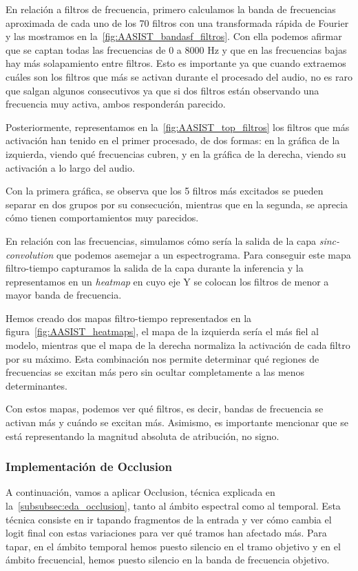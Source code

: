 En relación a filtros de frecuencia, primero calculamos la banda de frecuencias aproximada de cada uno de los 70 filtros con una transformada rápida de Fourier y las mostramos en la~\autoref{fig:AASIST_bandasf_filtros}. Con ella podemos afirmar que se captan todas las frecuencias de 0 a 8000 Hz y que en las frecuencias bajas hay más solapamiento entre filtros. Esto es importante ya que cuando extraemos cuáles son los filtros que más se activan durante el procesado del audio, no es raro que salgan algunos consecutivos ya que si dos filtros están observando una frecuencia muy activa, ambos responderán parecido.

Posteriormente, representamos en la~\autoref{fig:AASIST_top_filtros} los filtros que más activación han tenido en el primer procesado, de dos formas: en la gráfica de la izquierda, viendo qué frecuencias cubren, y en la gráfica de la derecha, viendo su activación a lo largo del audio.

Con la primera gráfica, se observa que los 5 filtros más excitados se pueden separar en dos grupos por su consecución, mientras que en la segunda, se aprecia cómo tienen comportamientos muy parecidos.

En relación con las frecuencias, simulamos cómo sería la salida de la capa \textit{sinc-convolution} que podemos asemejar a un espectrograma. Para conseguir este mapa filtro-tiempo capturamos la salida de la capa durante la inferencia y la representamos en un \textit{heatmap} en cuyo eje Y se colocan los filtros de menor a mayor banda de frecuencia.

Hemos creado dos mapas filtro-tiempo representados en la figura~\autoref{fig:AASIST_heatmaps}, el mapa de la izquierda sería el más fiel al modelo, mientras que el mapa de la derecha normaliza la activación de cada filtro por su máximo. Esta combinación nos permite determinar qué regiones de frecuencias se excitan más pero sin ocultar completamente a las menos determinantes.

Con estos mapas, podemos ver qué filtros, es decir, bandas de frecuencia se activan más y cuándo se excitan más. Asimismo, es importante mencionar que se está representando la magnitud absoluta de atribución, no signo.

\subsubsection*{Implementación de Occlusion}
A continuación, vamos a aplicar Occlusion, técnica explicada en la~\autoref{subsubsec:eda_occlusion}, tanto al ámbito espectral como al temporal. Esta técnica consiste en ir tapando fragmentos de la entrada y ver cómo cambia el logit final con estas variaciones para ver qué tramos han afectado más. Para tapar, en el ámbito temporal hemos puesto silencio en el tramo objetivo y en el ámbito frecuencial, hemos puesto silencio en la banda de frecuencia objetivo.

